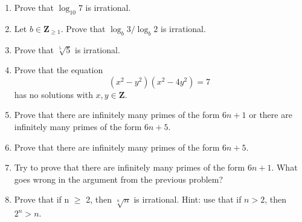 \documentclass[12pt, reqno]{amsart}
\begin{document}
\begin{enumerate}



\item Prove that $\log_{10} 7$ is irrational.
\vspace{4pt}

\item Let $b \in \mathbf{Z}_{\geq 1}$. Prove that $\log_b 3 / \log_b 2$ is irrational. 
\vspace{4pt}



\item Prove that $\sqrt[5]{5}$ is irrational.
\vspace{4pt}

\item Prove that the equation 
\[
(x^2 - y^2)(x^2 - 4y^2) = 7
\]
has no solutions with $x,y \in \mathbf{Z}$.


\item Prove that there are infinitely many primes of the form $6n+1$ or there are infinitely many primes of the form $6n+5$. 
\item Prove that there are infinitely many primes of the form $6n+5$.
\item Try to prove that there are infinitely many primes of the form $6n+1$. What goes wrong in the argument from the previous problem?


\item Prove that if n $\geq$ 2, then $\sqrt[n]{n}$ is
 irrational. Hint: use that if $n > 2$, then $2^n > n$.
\vspace{4pt}

\vspace{4pt}


\end{enumerate}
\end{document}
